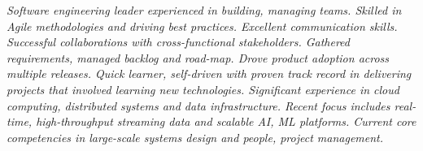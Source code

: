 {\selectfont
	\begin{justify}\textit{Software engineering leader experienced in building, managing teams. Skilled in Agile methodologies and driving best practices. Excellent communication skills. Successful collaborations with cross-functional stakeholders. Gathered requirements, managed backlog and road-map. Drove product adoption across multiple releases. Quick learner, self-driven with proven track record in delivering projects that involved learning new technologies. Significant experience in cloud computing, distributed systems and data infrastructure. Recent focus includes real-time, high-throughput streaming data and scalable AI, ML platforms. Current core competencies in large-scale systems design and people, project management.}\end{justify}
}